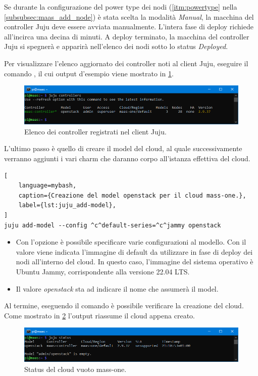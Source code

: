 Se durante la configurazione del power type dei nodi (\cref{itm:powertype} nella \cref{subsubsec:maas_add_node}) è stata scelta la modalità \emph{Manual}, la macchina del controller Juju deve essere avviata manualmente.
% 
L'intera fase di deploy richiede all'incirca una decina di minuti.
% 
A deploy terminato, la macchina del controller Juju si spegnerà e apparirà nell'elenco dei nodi sotto lo status \emph{Deployed}.

Per visualizzare l'elenco aggiornato dei controller noti al client Juju, eseguire il comando , il cui output d'esempio viene mostrato in \cref{fig:juju_controllers}.
% 
\begin{figure}[H]
    \centering
    \includegraphics[width=1\linewidth]{tesi/files/immagini/juju/juju controllers}
    \caption{Elenco dei controller registrati nel client Juju.}
    \label{fig:juju_controllers}
\end{figure}

\bigskip\noindent
L'ultimo passo è quello di creare il model del cloud, al quale successivamente verranno aggiunti i vari charm che daranno corpo all'istanza effettiva del cloud.
\begin{lstlisting}[
    language=mybash, 
    caption={Creazione del model openstack per il cloud mass-one.}, 
    label={lst:juju_add-model},
]
juju add-model --config ^c^default-series=^c^jammy openstack
\end{lstlisting}
% 
\begin{itemize}
    \item Con l'opzione  è possibile specificare varie configurazioni al modello.
    Con il valore  viene indicata l'immagine di default da utilizzare in fase di deploy dei nodi all'interno del cloud.
    In questo caso, l'immagine del sistema operativo è Ubuntu Jammy, corrispondente alla versione 22.04 LTS.
    
    \item Il valore \emph{openstack} sta ad indicare il nome che assumerà il model.
\end{itemize}
% 
Al termine, eseguendo il comando  è possibile verificare la creazione del cloud.
% 
Come mostrato in \cref{fig:juju_status1} l'output riassume il cloud appena creato.
% 
\begin{figure}[H]
    \centering
    \includegraphics[width=1\linewidth]{tesi/files/immagini/juju/juju status1}
    \caption{Status del cloud vuoto mass-one.}
    \label{fig:juju_status1}
\end{figure}

